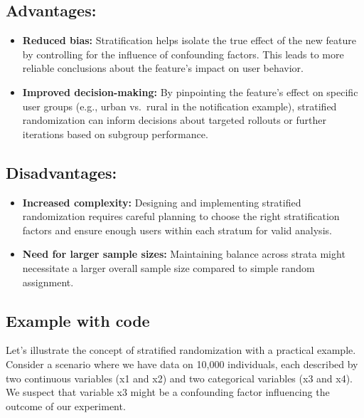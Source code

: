 \documentclass[
  letterpaper,
  DIV=11,
  numbers=noendperiod]{scrreprt}
\begin{document}
\subsection{Advantages:}\label{advantages}

\begin{itemize}
\item
  \textbf{Reduced bias:} Stratification helps isolate the true effect of
  the new feature by controlling for the influence of confounding
  factors. This leads to more reliable conclusions about the feature's
  impact on user behavior.
\item
  \textbf{Improved decision-making:} By pinpointing the feature's effect
  on specific user groups (e.g., urban vs.~rural in the notification
  example), stratified randomization can inform decisions about targeted
  rollouts or further iterations based on subgroup performance.
\end{itemize}

\subsection{Disadvantages:}\label{disadvantages}

\begin{itemize}
\item
  \textbf{Increased complexity:} Designing and implementing stratified
  randomization requires careful planning to choose the right
  stratification factors and ensure enough users within each stratum for
  valid analysis.
\item
  \textbf{Need for larger sample sizes:} Maintaining balance across
  strata might necessitate a larger overall sample size compared to
  simple random assignment.
\end{itemize}

\subsection{Example with code}\label{example-with-code-1}

Let's illustrate the concept of stratified randomization with a
practical example. Consider a scenario where we have data on 10,000
individuals, each described by two continuous variables (x1 and x2) and
two categorical variables (x3 and x4). We suspect that variable x3 might
be a confounding factor influencing the outcome of our experiment.
\end{document}

